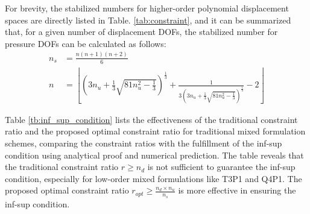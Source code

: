For brevity, the stabilized numbers for higher-order polynomial displacement spaces are directly listed in Table. \ref{tab:constraint}, and it can be summarized that, for a given number of displacement DOFs, the stabilized number for pressure DOFs can be calculated as follows:
\begin{align}
n_s &= \frac{n(n + 1)(n + 2)}{6} \\
n &= \left\lfloor
\left( 3n_u + \frac{1}{3}\sqrt{81n_u^2 - \frac{1}{3}} \right)^{\frac{1}{3}}
+
\frac{1}{3\left( 3n_u + \frac{1}{3}\sqrt{81n_u^2 - \frac{1}{3}} \right)^{\frac{1}{3}}} - 2
\right\rfloor
\end{align}

Table \ref{tb:inf_sup_condition} lists the effectiveness of the traditional constraint ratio and the proposed optimal constraint ratio for traditional mixed formulation schemes, comparing the constraint ratios with the fulfillment of the inf-sup condition using analytical proof and numerical prediction. The table reveals that the traditional constraint ratio $r \ge n_d$ is not sufficient to guarantee the inf-sup condition, especially for low-order mixed formulations like T3P1 and Q4P1. The proposed optimal constraint ratio $r_{opt} \ge \frac{n_d \times n_u}{n_s}$ is more effective in ensuring the inf-sup condition.

